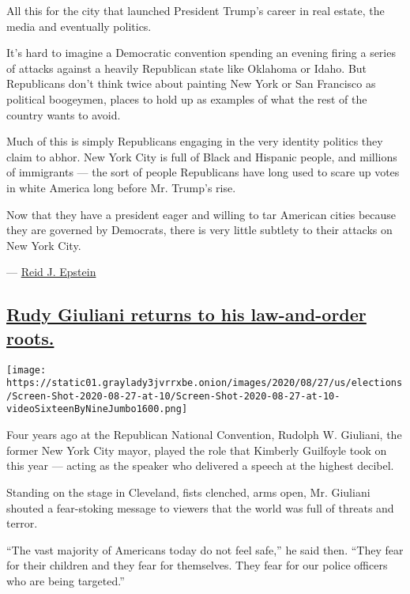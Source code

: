 All this for the city that launched President Trump's career in real
estate, the media and eventually politics.

It's hard to imagine a Democratic convention spending an evening firing
a series of attacks against a heavily Republican state like Oklahoma or
Idaho. But Republicans don't think twice about painting New York or San
Francisco as political boogeymen, places to hold up as examples of what
the rest of the country wants to avoid.

Much of this is simply Republicans engaging in the very identity
politics they claim to abhor. New York City is full of Black and
Hispanic people, and millions of immigrants --- the sort of people
Republicans have long used to scare up votes in white America long
before Mr. Trump's rise.

Now that they have a president eager and willing to tar American cities
because they are governed by Democrats, there is very little subtlety to
their attacks on New York City.

--- \href{https://www.nytimes3xbfgragh.onion/by/reid-j-epstein}{Reid J.
Epstein}

\hypertarget{rudy-giuliani-returns-to-his-law-and-order-roots}{%
\subsection{\texorpdfstring{\protect\hyperlink{rudy-giuliani-returns-to-his-law-and-order-roots}{Rudy
Giuliani returns to his law-and-order
roots.}}{Rudy Giuliani returns to his law-and-order roots.}}\label{rudy-giuliani-returns-to-his-law-and-order-roots}}

\texttt{[image: https://static01.graylady3jvrrxbe.onion/images/2020/08/27/us/elections/Screen-Shot-2020-08-27-at-10/Screen-Shot-2020-08-27-at-10-videoSixteenByNineJumbo1600.png]}

Four years ago at the Republican National Convention, Rudolph W.
Giuliani, the former New York City mayor, played the role that Kimberly
Guilfoyle took on this year --- acting as the speaker who delivered a
speech at the highest decibel.

Standing on the stage in Cleveland, fists clenched, arms open, Mr.
Giuliani shouted a fear-stoking message to viewers that the world was
full of threats and terror.

``The vast majority of Americans today do not feel safe,'' he said then.
``They fear for their children and they fear for themselves. They fear
for our police officers who are being targeted.''


